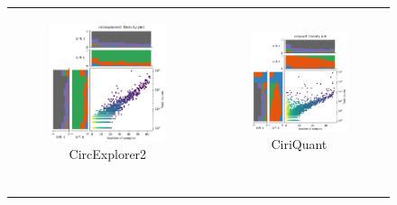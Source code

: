 \begin{figure}[ht]
    \begin{tabular}{cc}
        \begin{subfigure}{.5\textwidth}
            \centering

            \includegraphics[width=.8\linewidth]{chapters/4_results_and_discussion/figures/detection/min_samples_0/density/circexplorer2.png}
            \caption{CircExplorer2}
            \label{fig:detection_density_circexplorer2}
        \end{subfigure}
         &
        \begin{subfigure}{.5\textwidth}
            \centering

            \includegraphics[width=.8\linewidth]{chapters/4_results_and_discussion/figures/detection/min_samples_0/density/ciriquant.png}
            \caption{CiriQuant}
            \label{fig:detection_density_ciriquant}
        \end{subfigure} \\
        \begin{subfigure}{.5\textwidth}
            \centering


\end{subfigure}
\end{tabular}
\end{figure}
